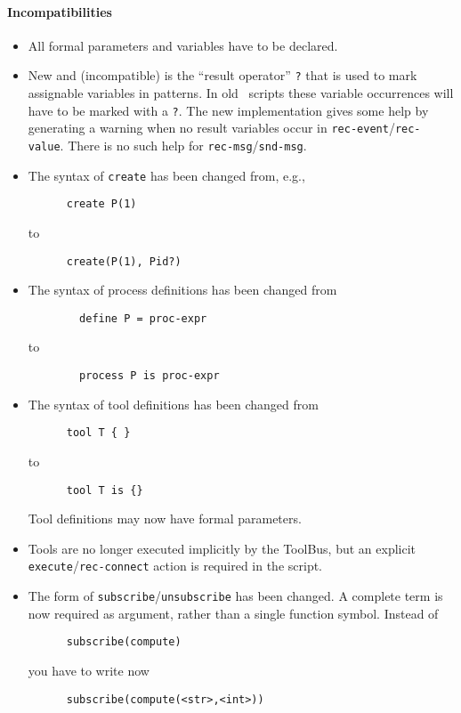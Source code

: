 \documentclass[a4,twoside,noweb]{article} %
\begin{document}
\paragraph{Incompatibilities}
\begin{itemize}

\item All formal parameters and variables have to be declared.

\item New and (incompatible) is the ``result operator'' {\tt ?} that is used
  to mark assignable variables in patterns. In old \T\ scripts these
  variable occurrences will have to be marked with a {\tt ?}.
  The new implementation gives some help by generating
  a warning when no result variables occur in {\tt rec-event}/{\tt rec-value}.
  There is no such help for {\tt rec-msg}/{\tt snd-msg}.

\item The syntax of {\tt create} has been changed from, e.g.,
\begin{verbatim}
      create P(1)
\end{verbatim}
to
\begin{verbatim}
      create(P(1), Pid?)
\end{verbatim}

\item The syntax of process definitions has been changed from
\begin{verbatim}
        define P = proc-expr
\end{verbatim}
  to
\begin{verbatim}
        process P is proc-expr
\end{verbatim}

\item  The syntax of tool definitions has been changed from
\begin{verbatim}
      tool T { }
\end{verbatim}
  to
\begin{verbatim}
      tool T is {}
\end{verbatim}
Tool definitions may now have formal parameters.

\item Tools are no longer executed implicitly by the ToolBus, but an
  explicit {\tt execute}/{\tt rec-connect} action is required in the script.

\item The form of {\tt subscribe}/{\tt unsubscribe} has been changed. A complete
  term is now required as argument, rather than a single function
  symbol. Instead of
\begin{verbatim}
      subscribe(compute)
\end{verbatim}
  you have to write now
\begin{verbatim}
      subscribe(compute(<str>,<int>))
\end{verbatim}

\end{itemize}
\end{document}
